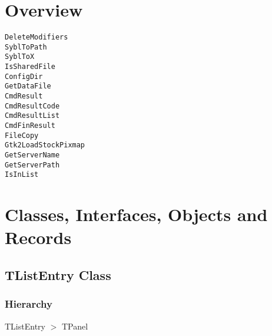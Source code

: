 \documentclass{report}
\newif\ifpdf
\begin{document}
\section{Overview}
\begin{description}
\item[\texttt{\begin{ttfamily}TListEntry\end{ttfamily} Class}]
\end{description}
\begin{description}
\item[\texttt{DeleteModifiers}]
\item[\texttt{SyblToPath}]
\item[\texttt{SyblToX}]
\item[\texttt{IsSharedFile}]
\item[\texttt{ConfigDir}]
\item[\texttt{GetDataFile}]
\item[\texttt{CmdResult}]
\item[\texttt{CmdResultCode}]
\item[\texttt{CmdResultList}]
\item[\texttt{CmdFinResult}]
\item[\texttt{FileCopy}]
\item[\texttt{Gtk2LoadStockPixmap}]
\item[\texttt{GetServerName}]
\item[\texttt{GetServerPath}]
\item[\texttt{IsInList}]
\end{description}
\section{Classes, Interfaces, Objects and Records}
\ifpdf
\subsection*{\large{\textbf{TListEntry Class}}\normalsize\hspace{1ex}\hrulefill}
\else
\subsection*{TListEntry Class}
\fi
\label{utilities.TListEntry}
\subsubsection*{\large{\textbf{Hierarchy}}\normalsize\hspace{1ex}\hfill}
TListEntry {$>$} TPanel
\end{document}
